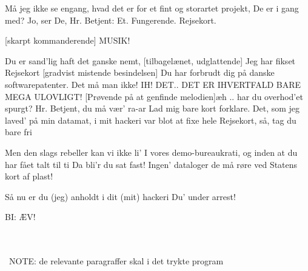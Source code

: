 \documentclass[a4paper,11pt]{article}
\begin{document}
\begin{sketch}

 Må jeg ikke se engang, hvad det er for et fint og storartet 
projekt, De er i gang med? 
%
      Jo, ser De, Hr. Betjent: 
      Et. Fungerende. Rejsekort. 




[skarpt kommanderende] MUSIK! 
\end{sketch}
\begin{song}
Du er sand'lig haft det ganske nemt, 
[tilbagelænet, udglattende]
Jeg har fikset Rejsekort 
[gradvist mistende besindelsen]
Du har forbrudt dig på danske softwarepatenter. Det må man ikke! IH! DET.. DET ER IHVERTFALD BARE MEGA ULOVLIGT!
[Prøvende på at genfinde melodien]æh .. har du overhod'et spurgt?
Hr. Betjent, du må vær' ra-ar 
Lad mig bare kort forklare. 
Det, som jeg laved' på min datamat, 
i mit hackeri 
var blot at fixe hele Rejsekort, 
så, tag du bare fri 

Men den slags rebeller kan vi ikke li' 
I vores demo-bureaukrati, 
og inden at du har fået talt til ti 
Da bli'r du sat fast! 
Ingen' dataloger de må røre ved 
Statens kort af plast! 

  Så nu er du (jeg) anholdt i dit (mit) hackeri 
  Du' under arrest! 

BI: ÆV! 
\end{song}

\\\\\
NOTE: de relevante paragraffer skal i det trykte program 
\end{document}
